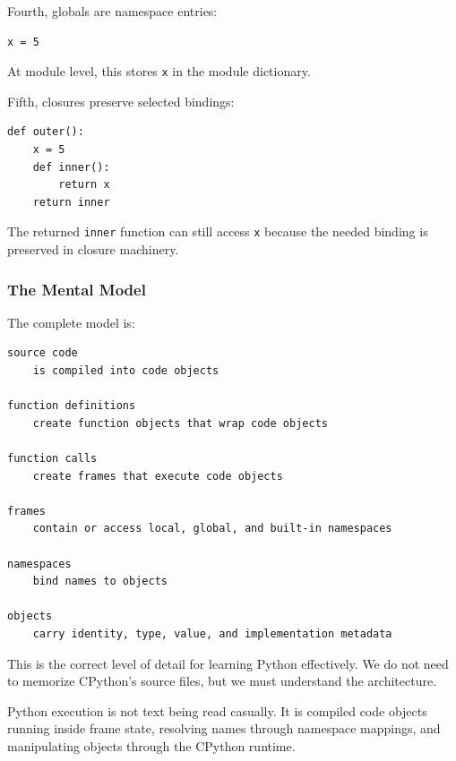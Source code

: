 Fourth, globals are namespace entries:

\begin{verbatim}
x = 5
\end{verbatim}

At module level, this stores \texttt{x} in the module dictionary.

Fifth, closures preserve selected bindings:

\begin{verbatim}
def outer():
    x = 5
    def inner():
        return x
    return inner
\end{verbatim}

The returned \texttt{inner} function can still access \texttt{x} because the needed binding is preserved in closure machinery.

\subsubsection{The Mental Model}

The complete model is:

\begin{verbatim}
source code
    is compiled into code objects

function definitions
    create function objects that wrap code objects

function calls
    create frames that execute code objects

frames
    contain or access local, global, and built-in namespaces

namespaces
    bind names to objects

objects
    carry identity, type, value, and implementation metadata
\end{verbatim}

This is the correct level of detail for learning Python effectively. We do not need to memorize CPython's source files, but we must understand the architecture.

Python execution is not text being read casually. It is compiled code objects running inside frame state, resolving names through namespace mappings, and manipulating objects through the CPython runtime.